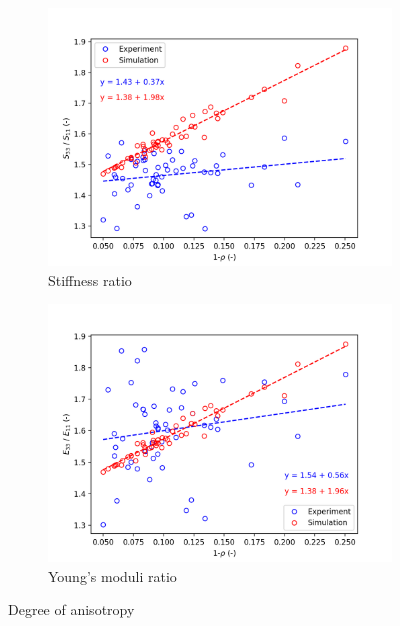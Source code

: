 \documentclass[a4paper,fleqn]{DC_ArtStyle}
\begin{document}
	\begin{figure}
		\centering
		\begin{subfigure}[b]{0.45\linewidth}
			\includegraphics[width=\linewidth]{../Results/ExpSim_AniS}
			\caption{Stiffness ratio}
		\end{subfigure}
		\begin{subfigure}[b]{0.45\linewidth}
			\includegraphics[width=\linewidth]{../Results/ExpSim_AniE}
			\caption{Young's moduli ratio}
		\end{subfigure}
		\caption{Degree of anisotropy}
	\end{figure}

	
	\clearpage
\end{document}
